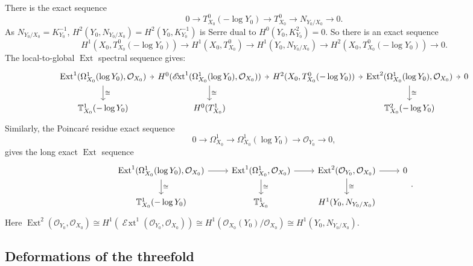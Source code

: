\documentclass[11pt]{article}
\theoremstyle{definition}
\newcommand{\OO}{\mathcal{O}}
\DeclareMathOperator{\sExt}{\mathscr{E}\!xt}
\DeclareMathOperator{\Ext}{Ext}
\begin{document}
There is the exact sequence
$$0\to T_{X_0}^0(-\log Y_0)\to T_{X_0}^0\to N_{Y_0/X_0}\to 0. $$
As $N_{Y_0/X_0}=K_{Y_0}^{-1}$, $H^2(Y_0, N_{Y_0/X_0})=H^2(Y_0, K_{Y_0}^{-1})$ is Serre dual to $H^0(Y_0, K_{Y_0}^2)=0$. 
So there is an exact sequence
\begin{equation}\label{eq:LEStanToNor}
  H^1(X_0, T_{X_0}^0(-\log Y_0))\to H^1(X_0, T_{X_0}^0)\to H^1(Y_0, N_{Y_0/X_0})\to H^2(X_0, T_{X_0}^0(-\log Y_0))\to 0. 
\end{equation}
The local-to-global $\Ext$ spectral sequence gives:
{\small 
\begin{equation} \label{eq:locToGlo} %
\begin{gathered}
\begin{tikzcd}[column sep=0.5em] %
\Ext^1(\Omega_{X_0}^1(\log Y_0), \OO_{X_0}) \ar[d, "\cong "] \ar[r] & H^0(\sExt^1(\Omega_{X_0}^1(\log Y_0), \OO_{X_0}))\ar[d, "\cong "] \ar[r]  & H^2(X_0, T_{X_0}^0(-\log Y_0)) \ar[r] & \Ext^2(\Omega_{X_0}^1(\log Y_0), \OO_{X_0}) \ar[r] \ar[d, "\cong"] & 0 \\
\mathbb{T}_{X_0}^1(-\log Y_0)  &  H^0(T_{X_0}^1) &      & \mathbb{T}_{X_0}^2(-\log Y_0) & 
\end{tikzcd}
\end{gathered}
\end{equation}
}
Similarly, the Poincaré residue exact sequence 
$$0\to \Omega_{X_0}^1\to \Omega_{X_0}^1(\log Y_0)\to \OO_{Y_0}\to 0, $$
gives the long exact $\Ext$ sequence
\begin{equation}\label{eq:DefPairToDef}
  \begin{tikzcd}
  \Ext^1(\Omega_{X_0}^1(\log Y_0),\OO_{X_0}) \ar[d, "\cong "] \ar[r] & \Ext^1(\Omega_{X_0}^1,\OO_{X_0}) \ar[d, "\cong"] \ar[r] & \Ext^2(\OO_{Y_0}, \OO_{X_0})\ar[d, "\cong"] \ar[r] & 0\\
  \mathbb{T}_{X_0}^1(-\log Y_0) & \mathbb{T}_{X_0}^1 & H^1(Y_0,N_{Y_0/X_0}) &
\end{tikzcd}.
\end{equation}
Here $\Ext^2(\OO_{Y_0}, \OO_{X_0})\cong H^1(\sExt^1(\OO_{Y_0}, \OO_{X_0}))\cong H^1(\OO_{X_0}(Y_0)/\OO_{X_0})\cong H^1(Y_0, N_{Y_0/X_0}).$
\subsection{Deformations of the threefold}
\end{document}
